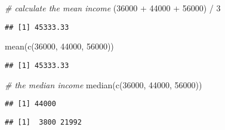\documentclass[
]{article}
\newenvironment{Shaded}{\begin{snugshade}}{\end{snugshade}}
\newcommand{\CommentTok}[1]{\textcolor[rgb]{0.56,0.35,0.01}{\textit{#1}}}
\newcommand{\DecValTok}[1]{\textcolor[rgb]{0.00,0.00,0.81}{#1}}
\newcommand{\FunctionTok}[1]{\textcolor[rgb]{0.00,0.00,0.00}{#1}}
\newcommand{\NormalTok}[1]{#1}
\newcommand{\SpecialCharTok}[1]{\textcolor[rgb]{0.00,0.00,0.00}{#1}}
\begin{document}
\begin{Shaded}
\begin{Highlighting}[]
\CommentTok{\# calculate the mean income}
\NormalTok{(}\DecValTok{36000} \SpecialCharTok{+} \DecValTok{44000} \SpecialCharTok{+} \DecValTok{56000}\NormalTok{) }\SpecialCharTok{/} \DecValTok{3}
\end{Highlighting}
\end{Shaded}

\begin{verbatim}
## [1] 45333.33
\end{verbatim}

\begin{Shaded}
\begin{Highlighting}[]
\FunctionTok{mean}\NormalTok{(}\FunctionTok{c}\NormalTok{(}\DecValTok{36000}\NormalTok{, }\DecValTok{44000}\NormalTok{, }\DecValTok{56000}\NormalTok{))}
\end{Highlighting}
\end{Shaded}

\begin{verbatim}
## [1] 45333.33
\end{verbatim}

\begin{Shaded}
\begin{Highlighting}[]
\CommentTok{\# the median income}
\FunctionTok{median}\NormalTok{(}\FunctionTok{c}\NormalTok{(}\DecValTok{36000}\NormalTok{, }\DecValTok{44000}\NormalTok{, }\DecValTok{56000}\NormalTok{))}
\end{Highlighting}
\end{Shaded}

\begin{verbatim}
## [1] 44000
\end{verbatim}

\begin{Shaded}
\end{Shaded}

\begin{verbatim}
## [1]  3800 21992
\end{verbatim}

\begin{Shaded}
\end{Shaded}
\end{document}

